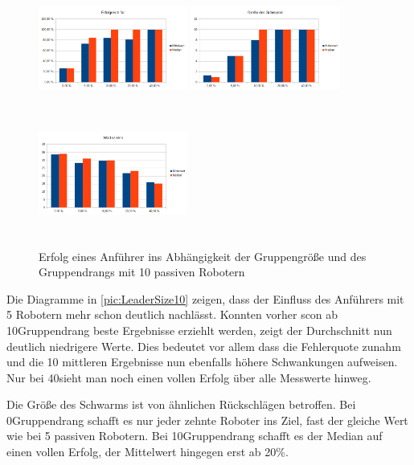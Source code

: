 \begin{figure}
	\includegraphics[width=4.9cm, height=4cm]{graphics/Statistics/Leader/FlockSize/10_1.png}
	\includegraphics[width=4.9cm, height=4cm]{graphics/Statistics/Leader/FlockSize/10_2.png}
	\includegraphics[width=4.9cm, height=4cm]{graphics/Statistics/Leader/FlockSize/10_3.png}
	\caption{Erfolg eines Anführer ins Abhängigkeit der Gruppengröße und des Gruppendrangs mit 10 passiven Robotern}
	\label{pic:LeaderSize10}
\end{figure}

Die Diagramme in \autoref{pic:LeaderSize10} zeigen, dass der Einfluss des Anführers mit 5 Robotern mehr schon deutlich nachlässt. Konnten vorher scon ab 10\per Gruppendrang beste Ergebnisse erziehlt werden, zeigt der Durchschnitt nun deutlich niedrigere Werte. Dies bedeutet vor allem dass die Fehlerquote zunahm und die 10 mittleren Ergebnisse nun ebenfalls höhere Schwankungen aufweisen. Nur bei 40\per sieht man noch einen vollen Erfolg über alle Messwerte hinweg.

Die Größe des Schwarms ist von ähnlichen Rückschlägen betroffen. Bei 0\per Gruppendrang schafft es nur jeder zehnte Roboter ins Ziel, fast der gleiche Wert wie bei 5 passiven Robotern. Bei 10\per Gruppendrang schafft es der Median auf einen vollen Erfolg, der Mittelwert hingegen erst ab 20\%.

